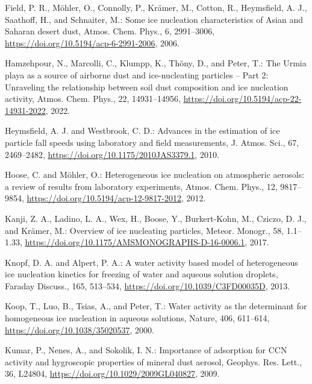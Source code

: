 \begin{thebibliography}{}
Field, P. R., M\"ohler, O., Connolly, P., Kr\"amer, M., Cotton, R., Heymsfield, A. J., Saathoff, H., and Schnaiter, M.: Some ice nucleation characteristics of Asian and Saharan desert dust, Atmos. Chem. Phys., 6, 2991--3006, \url{https://doi.org/10.5194/acp-6-2991-2006}, 2006.

Hamzehpour, N., Marcolli, C., Klumpp, K., Th\"ony, D., and Peter, T.: The Urmia playa as a source of airborne dust and ice-nucleating particles -- Part 2: Unraveling the relationship between soil dust composition and ice nucleation activity, Atmos. Chem. Phys., 22, 14931--14956, \url{https://doi.org/10.5194/acp-22-14931-2022}, 2022.

Heymsfield, A. J. and Westbrook, C. D.: Advances in the estimation of ice particle fall speeds using laboratory and field measurements, J. Atmos. Sci., 67, 2469--2482, \url{https://doi.org/10.1175/2010JAS3379.1}, 2010.

Hoose, C. and M\"ohler, O.: Heterogeneous ice nucleation on atmospheric aerosols: a review of results from laboratory experiments, Atmos. Chem. Phys., 12, 9817--9854, \url{https://doi.org/10.5194/acp-12-9817-2012}, 2012.

Kanji, Z. A., Ladino, L. A., Wex, H., Boose, Y., Burkert-Kohn, M., Cziczo, D. J., and Kr\"amer, M.: Overview of ice nucleating particles, Meteor. Monogr., 58, 1.1--1.33, \url{https://doi.org/10.1175/AMSMONOGRAPHS-D-16-0006.1}, 2017.

Knopf, D. A. and Alpert, P. A.: A water activity based model of heterogeneous ice nucleation kinetics for freezing of water and aqueous solution droplets, Faraday Discuss., 165, 513--534, \url{https://doi.org/10.1039/C3FD00035D}, 2013.

Koop, T., Luo, B., Tsias, A., and Peter, T.: Water activity as the determinant for homogeneous ice nucleation in aqueous solutions, Nature, 406, 611--614, \url{https://doi.org/10.1038/35020537}, 2000.

Kumar, P., Nenes, A., and Sokolik, I. N.: Importance of adsorption for CCN activity and hygroscopic properties of mineral dust aerosol, Geophys. Res. Lett., 36, L24804, \url{https://doi.org/10.1029/2009GL040827}, 2009.


\end{thebibliography}
